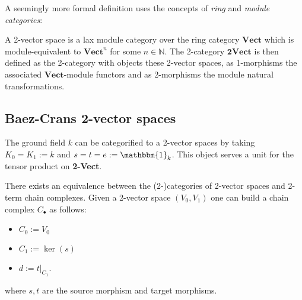     A seemingly more formal definition uses the concepts of \textit{ring} and \textit{module categories}:
    \begin{adefinition}
        A 2-vector space is a lax module category over the ring category $\mathbf{Vect}$ which is module-equivalent to $\mathbf{Vect}^n$ for some $n\in\mathbb{N}$. The 2-category $\mathbf{2Vect}$ is then defined as the 2-category with objects these 2-vector spaces, as 1-morphisms the associated $\mathbf{Vect}$-module functors and as 2-morphisms the module natural transformations.
    \end{adefinition}

\subsection{Baez-Crans 2-vector spaces}\label{section:baez_crans}


    \begin{example}
        The ground field $k$ can be categorified to a 2-vector spaces by taking $K_0=K_1:=k$ and $s=t=e:=\mathbbm{1}_k$. This object serves a unit for the tensor product on \textbf{2-Vect}. %
    \end{example}

    \begin{property}
        There exists an equivalence between the (2-)categories of 2-vector spaces and 2-term chain complexes. Given a 2-vector space $(V_0, V_1)$ one can build a chain complex $C_\bullet$ as follows:
        \begin{itemize}
            \item $C_0 := V_0$
            \item $C_1 := \ker(s)$
            \item $d := t|_{C_1}$.
        \end{itemize}
        where $s, t$ are the source morphism and target morphisms.
    \end{property}

